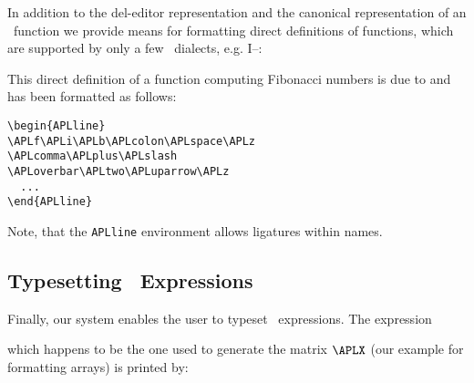 In addition to the del-editor representation and the canonical
representation of an \APL\ function we provide means for
formatting direct definitions of functions, which are supported
by only a few \APL\ dialects, e.g. I--\APL:
 
\begin{APLline}
\APLf\APLi\APLb\APLcolon\APLspace\APLz\APLcomma\APLplus\APLslash
\APLoverbar\APLtwo\APLuparrow\APLz\APLleftarrow\APLf\APLi\APLb
\APLspace\APLomega\APLbar\APLone\APLspace\APLcolon\APLspace
\APLomega\APLequal\APLone\APLspace\APLcolon\APLspace\APLone
\end{APLline}
 
This direct definition of a function computing Fibonacci numbers
is due to \cite{Iverson87} and has been formatted as follows:
 
\begin{verbatim}
\begin{APLline}
\APLf\APLi\APLb\APLcolon\APLspace\APLz
\APLcomma\APLplus\APLslash
\APLoverbar\APLtwo\APLuparrow\APLz
  ...
\end{APLline}
\end{verbatim}
%
 
Note, that the {\tt APLline} environment allows ligatures within names.
 
\subsection{Typesetting \bfAPL\ Expressions}
 
Finally, our system enables the user to typeset
\APL\ expressions. The expression
 
%
 
{\parsep=0pt %
\begin{APLbold}\begin{APLexpr}
\APLX\APLleftarrow\APLtwo\APLspace\APLtwo\APLrho
\APLleftparen\APLtwo\APLspace\APLtwo\APLrho\APLiota\APLfour\APLrightparen
\APLspace\APLquote\APLA\APLquote\APLspace\APLquote\APLB
\APLquote\APLspace\APLquote\APLbr\APLC\APLquote
\end{APLexpr}\end{APLbold}
}

{\parindent=0pt
which happens to be the one used to generate the matrix $\APLX$
(our example for formatting arrays) is printed by:
}
 

